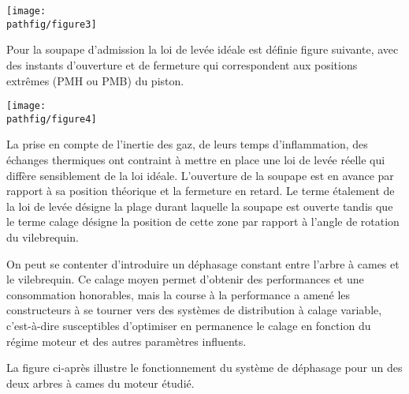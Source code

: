 \documentclass[10pt,fleqn]{article} %
\begin{document}
\begin{multicols}{2}
\begin{center}
\texttt{[image: \\pathfig/figure3]}
\end{center}


Pour la soupape d'admission la loi de levée idéale est définie figure suivante,%
avec des instants d'ouverture et de fermeture qui correspondent aux positions extrêmes (PMH ou PMB) du piston. 

\begin{center}
\texttt{[image: \\pathfig/figure4]}
\end{center}



La prise en compte de l'inertie des gaz, de leurs temps d'inflammation, des échanges thermiques ont contraint à mettre en place une loi de levée réelle qui diffère sensiblement de la loi idéale.  L'ouverture de la soupape est en avance par rapport à sa position théorique et la fermeture en retard. Le terme \og étalement\fg{} de la loi de levée désigne la plage durant laquelle la soupape est ouverte tandis que le terme \og calage\fg{} désigne la position de cette zone par rapport à l'angle de rotation du vilebrequin.

On peut se contenter d'introduire un déphasage constant entre l'arbre à cames et le vilebrequin. Ce calage \og moyen \fg{} permet d'obtenir des performances et une consommation honorables, mais la course à la performance a amené les constructeurs à se tourner vers des systèmes de distribution à calage variable, c'est-à-dire susceptibles d'optimiser en permanence le calage en fonction du régime moteur et des autres paramètres influents.


La figure ci-après illustre le fonctionnement du système de déphasage pour un des deux arbres à cames du moteur étudié.



\end{multicols}
\end{document}
